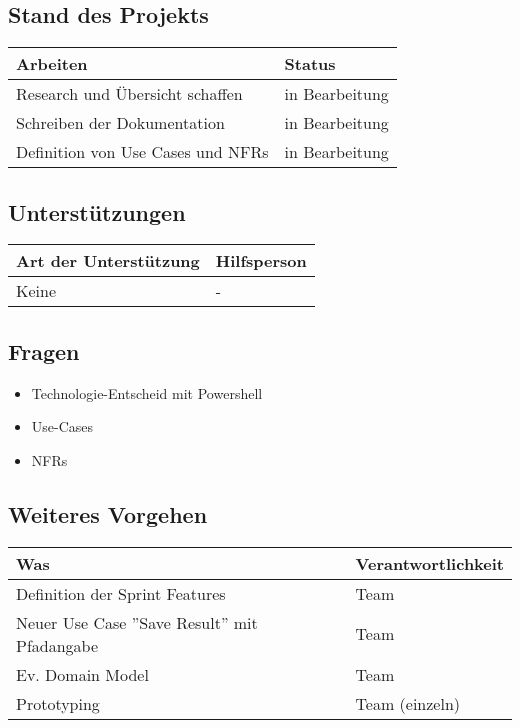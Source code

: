 \subsection*{Stand des Projekts}
\begin{table}[H]
    \centering
    \begin{tabular}{p{12cm} p{4cm}}
        \textbf{Arbeiten} & \textbf{Status} \\ \hline
        Research und Übersicht schaffen & in Bearbeitung \\ \hline
        Schreiben der Dokumentation & in Bearbeitung \\ \hline
        Definition von Use Cases und NFRs & in Bearbeitung \\ \hline
    \end{tabular}
\end{table}

\vspace{1cm}

\subsection*{Unterstützungen}
\begin{table}[H]
    \centering
    \begin{tabular}{p{12cm} p{4cm}}
        \textbf{Art der Unterstützung} & \textbf{Hilfsperson} \\ \hline
        Keine & - \\ \hline
    \end{tabular}
\end{table}

\vspace{1cm}

\subsection*{Fragen}
\begin{itemize}
    \item Technologie-Entscheid mit Powershell
    \item Use-Cases
    \item NFRs
\end{itemize}

\vspace{1cm}

\subsection*{Weiteres Vorgehen}
\begin{table}[H]
    \centering
    \begin{tabular}{p{12cm} p{4cm}}
        \textbf{Was} & \textbf{Verantwortlichkeit} \\ \hline
        Definition der Sprint Features & Team \\ \hline
        Neuer Use Case ''Save Result'' mit Pfadangabe & Team \\ \hline
        Ev. Domain Model & Team \\ \hline
        Prototyping & Team (einzeln) \\ \hline
    \end{tabular}
\end{table}

